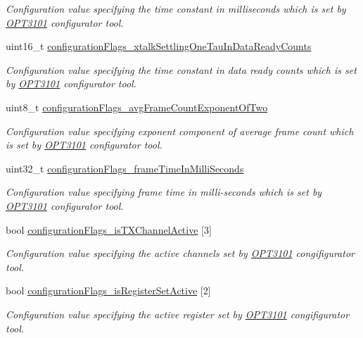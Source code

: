 \begin{DoxyCompactItemize}
\begin{DoxyCompactList}\small\item\em Configuration value specifying the time constant in milliseconds which is set by \mbox{\hyperlink{namespace_o_p_t3101}{O\+P\+T3101}} configurator tool. \end{DoxyCompactList}\item 
uint16\+\_\+t \mbox{\hyperlink{class_o_p_t3101_1_1device_acc3387f448c10f642260a031c5d0a11d}{configuration\+Flags\+\_\+xtalk\+Settling\+One\+Tau\+In\+Data\+Ready\+Counts}}
\begin{DoxyCompactList}\small\item\em Configuration value specifying the time constant in data ready counts which is set by \mbox{\hyperlink{namespace_o_p_t3101}{O\+P\+T3101}} configurator tool. \end{DoxyCompactList}\item 
uint8\+\_\+t \mbox{\hyperlink{class_o_p_t3101_1_1device_aa2216815a45a5641629331b10fd1ba2e}{configuration\+Flags\+\_\+avg\+Frame\+Count\+Exponent\+Of\+Two}}
\begin{DoxyCompactList}\small\item\em Configuration value specifying exponent component of average frame count which is set by \mbox{\hyperlink{namespace_o_p_t3101}{O\+P\+T3101}} configurator tool. \end{DoxyCompactList}\item 
uint32\+\_\+t \mbox{\hyperlink{class_o_p_t3101_1_1device_a5937bcbfb43b103d19b89285314f1351}{configuration\+Flags\+\_\+frame\+Time\+In\+Milli\+Seconds}}
\begin{DoxyCompactList}\small\item\em Configuration value specifying frame time in milli-\/seconds which is set by \mbox{\hyperlink{namespace_o_p_t3101}{O\+P\+T3101}} configurator tool. \end{DoxyCompactList}\item 
bool \mbox{\hyperlink{class_o_p_t3101_1_1device_aa911b5cc3747694d63c55a84b84dccd5}{configuration\+Flags\+\_\+is\+T\+X\+Channel\+Active}} \mbox{[}3\mbox{]}
\begin{DoxyCompactList}\small\item\em Configuration value specifying the active channels set by \mbox{\hyperlink{namespace_o_p_t3101}{O\+P\+T3101}} congifigurator tool. \end{DoxyCompactList}\item 
bool \mbox{\hyperlink{class_o_p_t3101_1_1device_a11813c9f13a5c970aa70d3318c4118b1}{configuration\+Flags\+\_\+is\+Register\+Set\+Active}} \mbox{[}2\mbox{]}
\begin{DoxyCompactList}\small\item\em Configuration value specifying the active register set by \mbox{\hyperlink{namespace_o_p_t3101}{O\+P\+T3101}} congifigurator tool. \end{DoxyCompactList}\end{DoxyCompactItemize}


